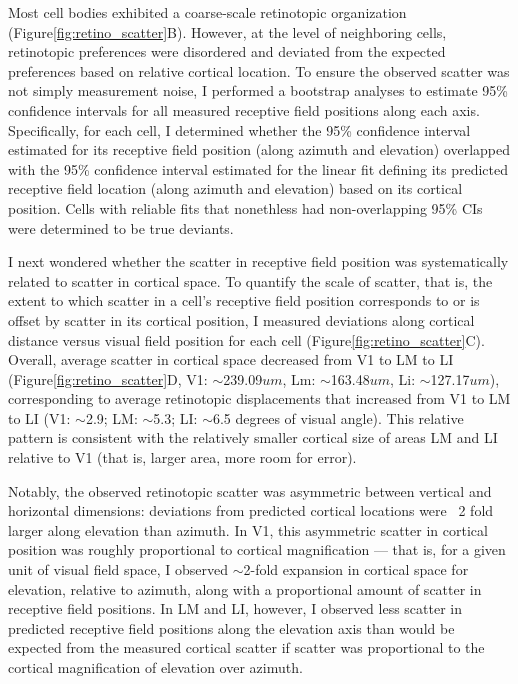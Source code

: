 Most cell bodies exhibited a coarse-scale retinotopic organization (Figure\ref{fig:retino_scatter}B). However, at the level of neighboring cells, retinotopic preferences were disordered and deviated from the expected preferences based on relative cortical location. To ensure the observed scatter was not simply measurement noise, I performed a bootstrap analyses to estimate 95\% confidence intervals for all measured receptive field positions along each axis. Specifically, for each cell, I determined whether the 95\% confidence interval estimated for its receptive field position (along azimuth and elevation) overlapped with the 95\% confidence interval estimated for the linear fit defining its predicted receptive field location (along azimuth and elevation) based on its cortical position. Cells with reliable fits that nonethless had non-overlapping 95\% CIs were determined to be true deviants. 

I next wondered whether the scatter in receptive field position was systematically related to scatter in cortical space. To quantify the scale of scatter, that is, the extent to which scatter in a cell's receptive field position corresponds to or is offset by scatter in its cortical position, I measured deviations along cortical distance versus visual field position for each cell (Figure\ref{fig:retino_scatter}C). Overall, average scatter in cortical space decreased from V1 to LM to LI (Figure\ref{fig:retino_scatter}D, V1: $\sim$239.09$um$, Lm: $\sim$163.48$um$, Li: $\sim$127.17$um$), corresponding to average retinotopic displacements that increased from V1 to LM to LI (V1: $\sim$2.9; LM: $\sim$5.3; LI: $\sim$6.5 degrees of visual angle). This relative pattern is consistent with the relatively smaller cortical size of areas LM and LI relative to V1 (that is, larger area, more room for error).  

Notably, the observed retinotopic scatter was asymmetric between vertical and horizontal dimensions:  deviations from predicted cortical locations were ~2 fold larger along elevation than azimuth. In V1, this asymmetric scatter in cortical position was roughly proportional to cortical magnification --- that is, for a given unit of visual field space, I observed $\sim$2-fold expansion in cortical space  for elevation, relative to azimuth, along with a proportional amount of scatter in receptive field positions. In LM and LI, however, I observed less scatter in predicted receptive field positions along the elevation axis than would be expected from the measured cortical scatter if scatter was proportional to the cortical magnification of elevation over azimuth.

